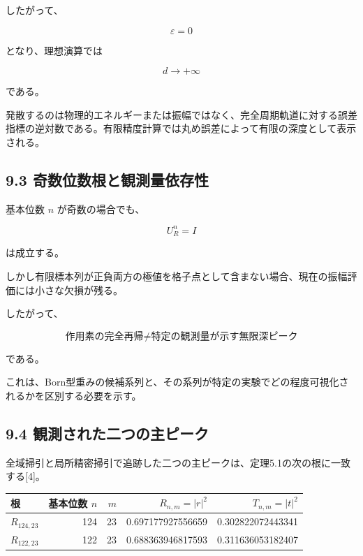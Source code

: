 \documentclass[
  a4paper,
  10pt]{article}
\newcounter{none} %
\begin{document}
したがって、

\[
\varepsilon=0
\]

となり、理想演算では

\[
d\rightarrow+\infty
\]

である。

発散するのは物理的エネルギーまたは振幅ではなく、完全周期軌道に対する誤差指標の逆対数である。有限精度計算では丸め誤差によって有限の深度として表示される。

\subsection{9.3
奇数位数根と観測量依存性}\label{93-ux5947ux6570ux4f4dux6570ux6839ux3068ux89b3ux6e2cux91cfux4f9dux5b58ux6027}

基本位数 \(n\) が奇数の場合でも、

\[
U_R^n=I
\]

は成立する。

しかし有限標本列が正負両方の極値を格子点として含まない場合、現在の振幅評価には小さな欠損が残る。

したがって、

\[
\boxed{
\text{作用素の完全再帰}
\neq
\text{特定の観測量が示す無限深ピーク}
}
\]

である。

これは、Born型重みの候補系列と、その系列が特定の実験でどの程度可視化されるかを区別する必要を示す。

\subsection{9.4
観測された二つの主ピーク}\label{94-ux89b3ux6e2cux3055ux308cux305fux4e8cux3064ux306eux4e3bux30d4ux30fcux30af}

全域掃引と局所精密掃引で追跡した二つの主ピークは、定理5.1の次の根に一致する{[}4{]}。

{\def\LTcaptype{none} %
\begin{longtable}[]{@{}lrrrr@{}}
\toprule\noalign{}
根 & 基本位数 \(n\) & \(m\) & \(R_{n,m}=\lvert r\rvert^2\) &
\(T_{n,m}=\lvert t\rvert^2\) \\
\midrule\noalign{}
\endhead
\bottomrule\noalign{}
\endlastfoot
\(R_{124,23}\) & 124 & 23 & 0.697177927556659 & 0.302822072443341 \\
\(R_{122,23}\) & 122 & 23 & 0.688363946817593 & 0.311636053182407 \\
\end{longtable}
}
\end{document}
